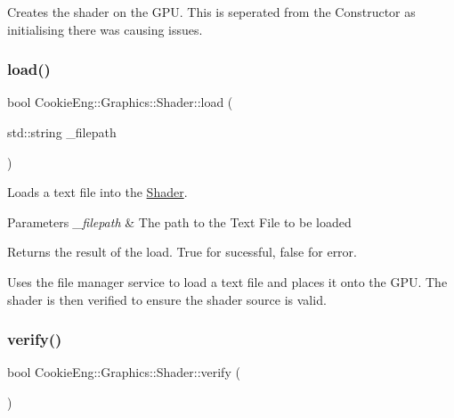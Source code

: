 Creates the shader on the G\+PU. This is seperated from the Constructor as initialising there was causing issues. \mbox{\label{class_cookie_eng_1_1_graphics_1_1_shader_aa11548ffaa72d77521576044a122af43}} 
\subsubsection{\texorpdfstring{load()}{load()}}
{\footnotesize\ttfamily bool Cookie\+Eng\+::\+Graphics\+::\+Shader\+::load (\begin{DoxyParamCaption}\item[{std\+::string}]{\+\_\+filepath }\end{DoxyParamCaption})}



Loads a text file into the \hyperlink{class_cookie_eng_1_1_graphics_1_1_shader}{Shader}. 


\begin{DoxyParams}{Parameters}
{\em \+\_\+filepath} & The path to the Text File to be loaded \\
\hline
\end{DoxyParams}
\begin{DoxyReturn}{Returns}
the result of the load. True for sucessful, false for error.
\end{DoxyReturn}
Uses the file manager service to load a text file and places it onto the G\+PU. The shader is then verified to ensure the shader source is valid. \mbox{\label{class_cookie_eng_1_1_graphics_1_1_shader_a28abd2dba4a183cb810b196af2e1d5a3}} 
\subsubsection{\texorpdfstring{verify()}{verify()}}
{\footnotesize\ttfamily bool Cookie\+Eng\+::\+Graphics\+::\+Shader\+::verify (\begin{DoxyParamCaption}{ }\end{DoxyParamCaption})}



